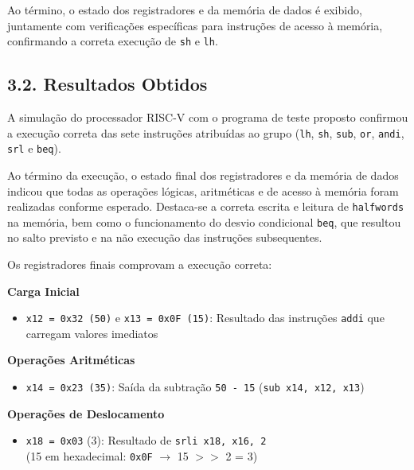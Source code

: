 \documentclass[12pt, a4paper]{article}
\begin{document}
Ao término, o estado dos registradores e da memória de dados é exibido, juntamente com verificações específicas para instruções de acesso à memória, confirmando a correta execução de \texttt{sh} e \texttt{lh}.

\subsection*{3.2. Resultados Obtidos}

A simulação do processador RISC-V com o programa de teste proposto confirmou a execução correta das sete instruções atribuídas ao grupo (\texttt{lh}, \texttt{sh}, \texttt{sub}, \texttt{or}, \texttt{andi}, \texttt{srl} e \texttt{beq}). 

Ao término da execução, o estado final dos registradores e da memória de dados indicou que todas as operações lógicas, aritméticas e de acesso à memória foram realizadas conforme esperado. Destaca-se a correta escrita e leitura de \texttt{halfwords} na memória, bem como o funcionamento do desvio condicional \texttt{beq}, que resultou no salto previsto e na não execução das instruções subsequentes.

Os registradores finais comprovam a execução correta:
\vspace{0.3cm}

\noindent\textbf{Carga Inicial}
\begin{itemize}
    \item \texttt{x12 = 0x32 (50)} e \texttt{x13 = 0x0F (15)}: Resultado das instruções \texttt{addi} que carregam valores imediatos
\end{itemize}

\vspace{0.3cm}

\noindent\textbf{Operações Aritméticas}
\begin{itemize}
    \item \texttt{x14 = 0x23 (35)}: Saída da subtração \texttt{50 - 15} (\texttt{sub x14, x12, x13})
\end{itemize}

\vspace{0.3cm}

\noindent\textbf{Operações de Deslocamento}
\begin{itemize}
    \item \texttt{x18 = 0x03} (3): Resultado de \texttt{srli x18, x16, 2} \\
    (15 em hexadecimal: \texttt{0x0F} $\rightarrow$ 15 $>>$ 2 = 3) \\
\end{itemize}
\end{document}
